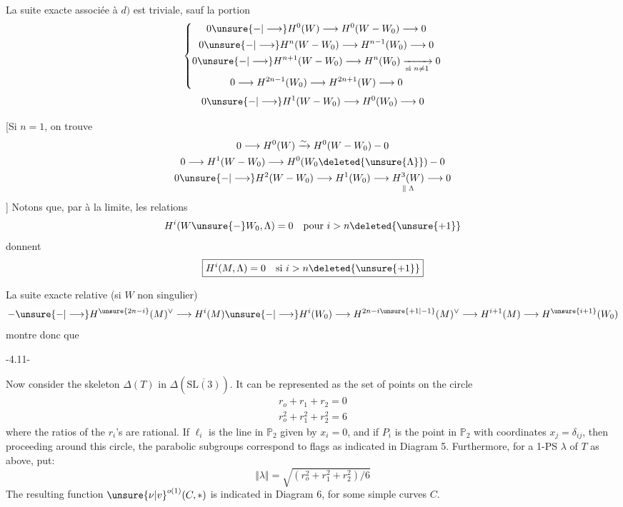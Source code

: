 La suite exacte associée à $d)$ est triviale, sauf la portion
\[\left\{\begin{gathered}
0\unsure{\mathbin{-}|\longrightarrow}H^0(W)\longrightarrow H^0(W-W_0)\longrightarrow0\\
0\unsure{\mathbin{-}|\longrightarrow}H^n(W-W_0)\longrightarrow H^{n-1}(W_0)\longrightarrow0\\
0\unsure{\mathbin{-}|\longrightarrow}H^{n+1}(W-W_0)\longrightarrow H^n(W_0)\xrightarrow[\text{si }n\ne1]{}0\\
0\longrightarrow H^{2n-1}(W_0)\longrightarrow H^{2n+1}(W)\longrightarrow0
\end{gathered}\right.\]
\[0\unsure{\mathbin{-}|\longrightarrow}H^1(W-W_0)\longrightarrow H^0(W_0)\longrightarrow0\]
\deleted{\[\unsure{n+1\ne2n+1}\]}
\deleted{\[n+2\ne2n+1\]}

[Si $n=1$, on trouve
\[\begin{gathered}
0\longrightarrow H^0(W)\xrightarrow{\sim}H^0(W-W_0)\mathbin{-}0\\
0\longrightarrow H^1(W-W_0)\longrightarrow H^0(W_0\deleted{\unsure{\Lambda}})\mathbin{-}0\\
0\unsure{\mathbin{-}|\longrightarrow}H^2(W-W_0)\longrightarrow H^1(W_0)\longrightarrow\underset{\Vert\;\Lambda}{H^3(W)}\longrightarrow0
\end{gathered}\]
]
Notons que, par  à la limite,  les relations
\[H^i(W\unsure{-}W_0,\Lambda)=0\quad\text{pour }i>n\deleted{\unsure{+1}}\]
donnent
\[\boxed{H^i(M,\Lambda)=0\quad\text{si }i>n\deleted{\unsure{+1}}}\]

La suite exacte relative (si $W$ non singulier)
\[\mathbin{-}\unsure{\mathbin{-}|\longrightarrow}H^{\unsure{2n-i}}(M)^\vee\longrightarrow H^i(M)\unsure{\mathbin{-}|\longrightarrow}H^i(W_0)\longrightarrow H^{2n-i\unsure{+1|-1}}(M)^\vee\longrightarrow H^{i+1}(M)\longrightarrow H^{\unsure{i+1}}(W_0)\]
montre donc que

\begin{center}-4.11-\end{center}
Now consider the skeleton $\Delta(T)$ in $\Delta(\overline{\mathrm{SL}(3)})$. It can be represented as the set of points on the circle
\[\begin{gathered}r_o+r_1+r_2=0\\r_o^2+r_1^2+r_2^2=6\end{gathered}\]
where the ratios of the $r_i$'s are rational. If $\ell_i$ is the line in $\mathbb P_2$ given by $x_i=0$, and if $P_i$ is the point in $\mathbb P_2$ with coordinates $x_j=\delta_{ij}$, then proceeding around this circle, the parabolic subgroups correspond to flags as indicated in Diagram 5. Furthermore, for a 1-PS $\lambda$ of $T$ as above, put:
\[\Vert\lambda\Vert=\sqrt{(r_o^2+r_1^2+r_2^2)/6}\]
The resulting function $\unsure{\nu|v}^{o(1)}(C,*)$ is indicated in Diagram 6, for some simple curves $C$.

